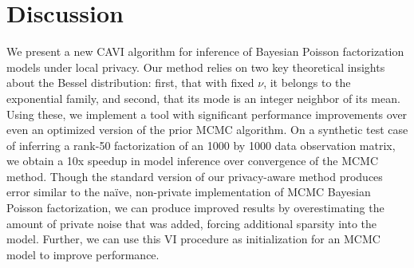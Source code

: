 \documentclass{article}
\newcommand{\naive}{na\"{i}ve}
\begin{document}
  \section{Discussion}
  We present a new CAVI algorithm for inference of Bayesian Poisson
  factorization models under local privacy. Our method relies on two key
  theoretical insights about the Bessel distribution: first, that with fixed
  $\nu$, it belongs to the exponential family, and second, that its mode is an
  integer neighbor of its mean. Using these, we implement a tool with
  significant performance improvements over even an optimized version of the
  prior MCMC algorithm. On a synthetic test case of inferring a rank-50
  factorization of an 1000 by 1000 data observation matrix, we obtain a 10x
  speedup in model inference over convergence of the MCMC method. Though the
  standard version of our privacy-aware method produces error similar to the
  \naive, non-private implementation of MCMC Bayesian Poisson factorization, we
  can produce improved results by overestimating the amount of private noise
  that was added, forcing additional sparsity into the model. Further, we can
  use this VI procedure as initialization for an MCMC model to improve
  performance.
  
  
  
  
\end{document}
